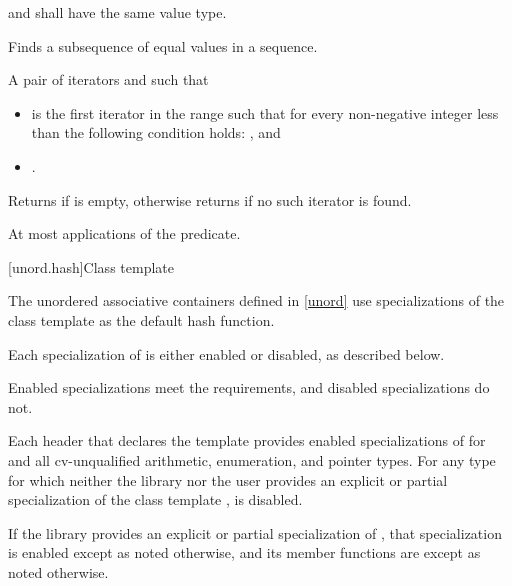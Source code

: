 \begin{itemdescr}
\pnum
\requires
{} and  shall have the same value type.

\pnum
\effects
Finds a subsequence of equal values in a sequence.

\pnum
\returns
A pair of iterators  and  such that
\begin{itemize}
\item {} is the first iterator  in the range
 such that
for every non-negative integer  less than 
the following condition holds:
, and
\item {}.
\end{itemize}
Returns  if  is empty,
otherwise returns  if no such iterator is found.

\pnum
\complexity
At most  applications of the predicate.
\end{itemdescr}

[unord.hash]{Class template }

\pnum
{}%
%
The unordered associative containers defined in \ref{unord} use
specializations of the class template 
as the default hash function.

\pnum
Each specialization of  is either enabled or disabled,
as described below.
\begin{note}
Enabled specializations meet the  requirements, and
disabled specializations do not.
\end{note}
Each header that declares the template 
provides enabled specializations of  for  and
all cv-unqualified arithmetic, enumeration, and pointer types.
For any type  for which neither the library nor the user provides
an explicit or partial specialization of the class template ,
 is disabled.

\pnum
If the library provides an explicit or partial specialization of ,
that specialization is enabled except as noted otherwise,
and its member functions are  except as noted otherwise.

